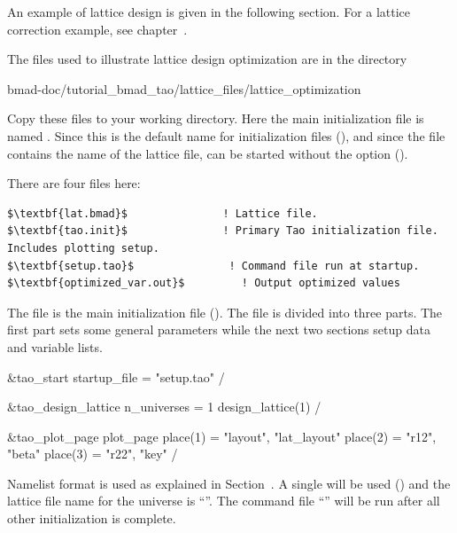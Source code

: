 \documentclass{hitec}     %
\begin{document}
An example of lattice design is given in the following section. For a lattice correction example, see 
chapter~.

The files used to illustrate lattice design optimization are in the directory 
\begin{code}
bmad-doc/tutorial_bmad_tao/lattice_files/lattice_optimization
\end{code}
Copy these files to your working directory. Here the main initialization file is named
. Since this is the default name for initialization files (), and
since the  file contains the name of the lattice file, \tao can be started without the
 option ().

There are four files here:
\begin{lstlisting}[mathescape]
$\textbf{lat.bmad}$               ! Lattice file.
$\textbf{tao.init}$               ! Primary Tao initialization file. Includes plotting setup.
$\textbf{setup.tao}$               ! Command file run at startup.
$\textbf{optimized_var.out}$         ! Output optimized values
\end{lstlisting}

The file  is the main initialization file (). The file is divided
into three parts. The first part sets some general parameters while the next two sections setup data
 and variable  lists.
\begin{code}
&tao_start
  startup_file = "setup.tao"
/

&tao_design_lattice
  n_universes = 1
  design_lattice(1)%
/

&tao_plot_page
  plot_page%
  place(1) = "layout", "lat_layout"
  place(2) = "r12", "beta"
  place(3) = "r22", "key"
/
\end{code}
Namelist format is used as explained in Section~. A single  will be
used () and the lattice file name for the universe is ``''. The
command file ``'' will be run after all other initialization is complete.
\end{document}
